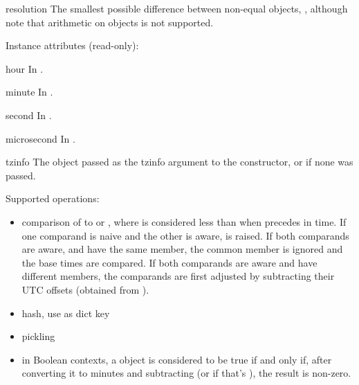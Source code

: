 \begin{memberdesc}{resolution}
  The smallest possible difference between non-equal 
  objects, , although note that
  arithmetic on  objects is not supported.
\end{memberdesc}

Instance attributes (read-only):

\begin{memberdesc}{hour}
  In .
\end{memberdesc}

\begin{memberdesc}{minute}
  In .
\end{memberdesc}

\begin{memberdesc}{second}
  In .
\end{memberdesc}

\begin{memberdesc}{microsecond}
  In .
\end{memberdesc}

\begin{memberdesc}{tzinfo}
  The object passed as the tzinfo argument to the 
  constructor, or  if none was passed.
\end{memberdesc}

Supported operations:

\begin{itemize}
  \item
    comparison of  to  or ,
    where  is considered less than  when  precedes
     in time.  If one comparand is naive and the other is aware,
     is raised.  If both comparands are aware, and
    have the same  member, the common 
    member is ignored and the base times are compared.  If both
    comparands are aware and have different  members,
    the comparands are first adjusted by subtracting their UTC offsets
    (obtained from ).

  \item
    hash, use as dict key

  \item
    pickling

  \item
    in Boolean contexts, a  object is considered to be
    true if and only if, after converting it to minutes and
    subtracting  (or  if that's
    ), the result is non-zero.
\end{itemize}

